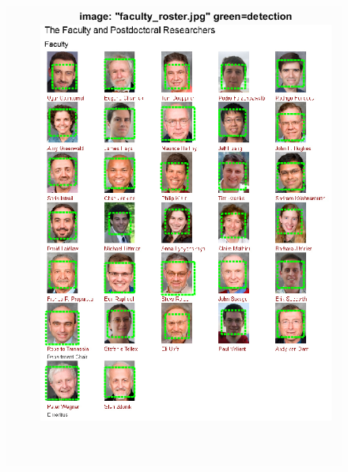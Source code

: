 \documentclass{article}
\begin{document}
\begin{figure}[!htb]
  \centering
  \includegraphics[width=.99\textwidth]{roster.png}
\end{figure}%
\end{document}
